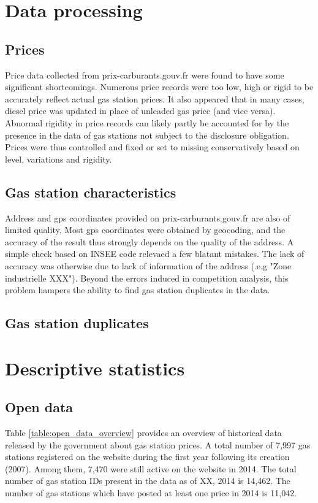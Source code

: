 \documentclass[11pt]{article}
\begin{document}
\section{Data processing}

\subsection{Prices}

Price data collected from prix-carburants.gouv.fr were found to have some significant shortcomings. Numerous price records were too low, high or rigid to be accurately reflect actual gas station prices. It also appeared that in many cases, diesel price was updated in place of unleaded gas price (and vice versa). Abnormal rigidity in price records can likely partly be accounted for by the presence in the data of gas stations not subject to the disclosure obligation. Prices were thus controlled and fixed or set to missing conservatively based on level, variations and rigidity.

\subsection{Gas station characteristics}

Address and gps coordinates provided on prix-carburants.gouv.fr are also of limited quality. Most gps coordinates were obtained by geocoding, and the accuracy of the result thus strongly depends on the quality of the address. A simple check based on INSEE code relevaed a few blatant mistakes. The lack of accuracy was otherwise due to lack of information of the address (.e.g "Zone industrielle XXX"). Beyond the errors induced in competition analysis, this problem hampers the ability to find gas station duplicates in the data.

\subsection{Gas station duplicates}

\section{Descriptive statistics}

\subsection{Open data}

Table \ref{table:open_data_overview} provides an overview of historical data released by the government about gas station prices. A total number of 7,997 gas stations registered on the website during the first year following its creation (2007). Among them, 7,470 were still active on the website in 2014. The total number of gas station IDs present in the data as of XX, 2014 is 14,462. The number of gas stations which have posted at least one price in 2014 is 11,042.
\end{document}
